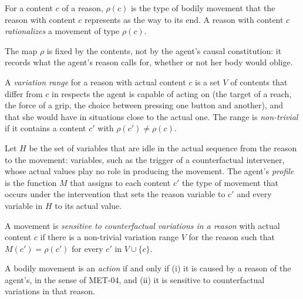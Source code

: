 \documentclass{situationist-preprint}
\begin{document}
\begin{definition}\label{d:rat}
For a content $c$ of a reason, $\rho(c)$ is the type of bodily movement that the reason with content $c$ represents as the way to its end. A reason with content $c$ \emph{rationalizes} a movement of type $\rho(c)$.
\end{definition}

The map $\rho$ is fixed by the contents, not by the agent's causal constitution: it records what the agent's reason calls for, whether or not her body would oblige.

\begin{definition}\label{d:range}
A \emph{variation range} for a reason with actual content $c$ is a set $V$ of contents that differ from $c$ in respects the agent is capable of acting on (the target of a reach, the force of a grip, the choice between pressing one button and another), and that she would have in situations close to the actual one. The range is \emph{non-trivial} if it contains a content $c'$ with $\rho(c') \neq \rho(c)$.
\end{definition}

\begin{definition}[Profile]\label{d:profile}
Let $H$ be the set of variables that are idle in the actual sequence from the reason to the movement: variables, such as the trigger of a counterfactual intervener, whose actual values play no role in producing the movement. The agent's \emph{profile} is the function $M$ that assigns to each content $c'$ the type of movement that occurs under the intervention that sets the reason variable to $c'$ and every variable in $H$ to its actual value.
\end{definition}

\begin{definition}[Sensitivity]\label{d:sens}
A movement is \emph{sensitive to counterfactual variations in a reason} with actual content $c$ if there is a non-trivial variation range $V$ for the reason such that $M(c') = \rho(c')$ for every $c'$ in $V \cup \{c\}$.
\end{definition}

\begin{definition}[Action]\label{d:action}
A bodily movement is an \emph{action} if and only if (i) it is caused by a reason of the agent's, in the sense of MET-04, and (ii) it is sensitive to counterfactual variations in that reason.
\end{definition}
\end{document}
